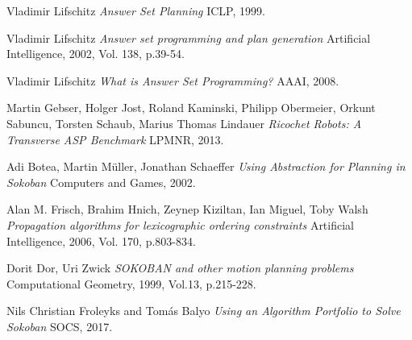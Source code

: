 \begin{thebibliography}{}
Vladimir Lifschitz
\textit{Answer Set Planning}
ICLP, 1999.

Vladimir Lifschitz
\textit{Answer set programming and plan generation}
Artificial Intelligence, 2002, Vol. 138, p.39-54.

Vladimir Lifschitz
\textit{What is Answer Set Programming?}
AAAI, 2008.

Martin Gebser, Holger Jost, Roland Kaminski, Philipp Obermeier, Orkunt Sabuncu, Torsten Schaub, Marius Thomas Lindauer
\textit{Ricochet Robots: A Transverse ASP Benchmark}
LPMNR, 2013.

Adi Botea, Martin Müller, Jonathan Schaeffer
\textit{Using Abstraction for Planning in Sokoban}
Computers and Games, 2002.

Alan M. Frisch, Brahim Hnich, Zeynep Kiziltan, Ian Miguel, Toby Walsh
\textit{Propagation algorithms for lexicographic ordering constraints}
Artificial Intelligence, 2006, Vol. 170, p.803-834.

Dorit Dor, Uri Zwick
\textit{SOKOBAN and other motion planning problems}
Computational Geometry, 1999, Vol.13, p.215-228.

Nils Christian Froleyks and Tom{\'a}s Balyo
\textit{Using an Algorithm Portfolio to Solve Sokoban}
SOCS, 2017.
\end{thebibliography}